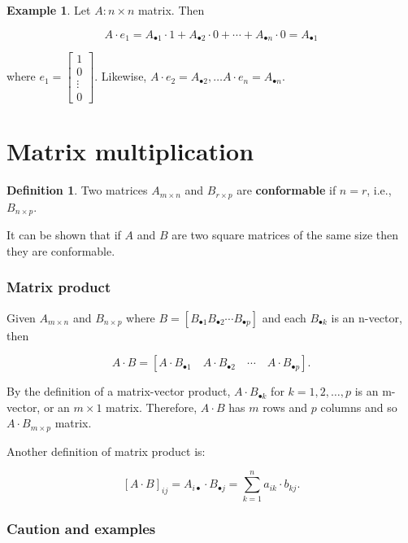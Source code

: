 \documentclass[12pt]{article}
\theoremstyle{definition}
\newtheorem*{definition}{Definition}
\newtheorem*{example}{Example}
\begin{document}
\begin{example}
Let $A: n \times n$ matrix. Then

\[
A \cdot e_1 = A_{\bullet 1} \cdot 1 + A_{\bullet 2} \cdot 0 + \cdots + A_{\bullet n} \cdot 0 = A_{\bullet 1}
\]

where $e_1 = \begin{bmatrix} 1 \\ 0 \\ \vdots \\ 0 \end{bmatrix}$. Likewise,
$A \cdot e_2 = A_{\bullet 2} , \ldots A \cdot e_n = A_{\bullet n}$.
\end{example}

\section{Matrix multiplication}

\begin{definition}
Two matrices $A_{m \times n}$ and $B_{r \times p}$ are \textbf{conformable} if $n = r$, i.e., $B_{n \times p}$.
\end{definition}

It can be shown that if $A$ and $B$ are two square matrices of the same size then they are conformable.

\subsubsection{Matrix product}

Given $A_{m \times n}$ and $B_{n \times p}$ where $B = [B_{\bullet 1} B_{\bullet 2} \cdots B_{\bullet p}]$ and
each $B_{\bullet k}$ is an n-vector, then

\[
A \cdot B = [A \cdot B_{\bullet 1} \quad A \cdot B_{\bullet 2} \quad \cdots \quad A \cdot B_{\bullet p}].
\]

By the definition of a matrix-vector product, $A \cdot B_{\bullet k}$ for $k = 1, 2, \ldots, p$ is an m-vector,
or an $m \times 1$ matrix. Therefore, $A \cdot B$ has $m$ rows and $p$ columns and so $A \cdot B_{m \times p}$
matrix.

Another definition of matrix product is:

\[
\left[ A \cdot B \right]_{ij} = A_{i \bullet} \cdot B_{\bullet j} = \sum_{k = 1}^{n} a_{ik} \cdot b_{kj}.
\]

\subsubsection{Caution and examples}
\end{document}
